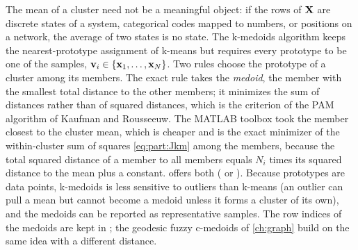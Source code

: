 The mean of a cluster need not be a meaningful object: if the rows of $\mathbf{X}$ are discrete states of a system, categorical codes mapped to numbers, or positions on a network, the average of two states is no state. The k-medoids algorithm \cite{kaufman:1990:groups} keeps the nearest-prototype assignment of k-means but requires every prototype to be one of the samples, $\mathbf{v}_i\in\{\mathbf{x}_1,\dots,\mathbf{x}_N\}$. Two rules choose the prototype of a cluster among its members. The exact rule takes the \emph{medoid}, the member with the smallest total distance to the other members; it minimizes the sum of distances rather than of squared distances, which is the criterion of the PAM algorithm of Kaufman and Rousseeuw. The MATLAB toolbox took the member closest to the cluster mean, which is cheaper and is the exact minimizer of the within-cluster sum of squares \eqref{eq:part:Jkm} among the members, because the total squared distance of a member to all members equals $N_i$ times its squared distance to the mean plus a constant.  offers both ( or ). Because prototypes are data points, k-medoids is less sensitive to outliers than k-means (an outlier can pull a mean but cannot become a medoid unless it forms a cluster of its own), and the medoids can be reported as representative samples. The row indices of the medoids are kept in ; the geodesic fuzzy c-medoids of \cref{ch:graph} build on the same idea with a different distance.


